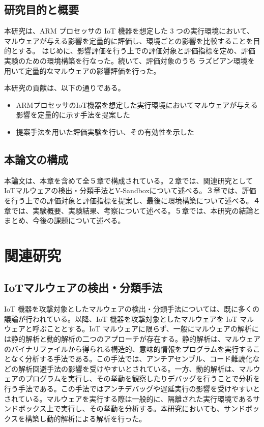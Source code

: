 \documentclass[12pt,a4paper,titlepage,report]{jsbook}
\begin{document}
\section{研究目的と概要}
本研究は、ARM プロセッサの IoT 機器を想定した 3 つの実行環境において、マルウェアが与える影響を定量的に評価し、環境ごとの影響を比較することを目的とする。
はじめに、影響評価を行う上での評価対象と評価指標を定め、評価実験のための環境構築を行なった。続いて、評価対象のうち ラズビアン環境を用いて定量的なマルウェアの影響評価を行った。


本研究の貢献は、以下の通りである。
\begin{itemize}
    \item ARMプロセッサのIoT機器を想定した実行環境においてマルウェアが与える影響を定量的に示す手法を提案した
    \item 提案手法を用いた評価実験を行い、その有効性を示した
\end{itemize}

\section{本論文の構成}
本論文は、本章を含めて全５章で構成されている。２章では、関連研究としてIoTマルウェアの検出・分類手法とV-Sandboxについて述べる。３章では、評価を行う上での評価対象と評価指標を提案し、最後に環境構築について述べる。４章では、実験概要、実験結果、考察について述べる。５章では、本研究の結論とまとめ、今後の課題について述べる。




\chapter{関連研究}
\section{IoTマルウェアの検出・分類手法}
IoT 機器を攻撃対象としたマルウェアの検出・分類手法については、既に多くの議論が行われている。以降、IoT 機器を攻撃対象としたマルウェアを IoT マルウェアと呼ぶこととする。IoT マルウェアに限らず、一般にマルウェアの解析には静的解析と動的解析の二つのアプローチが存在する。静的解析は、マルウェアのバイナリファイルから得られる構造的、意味的情報をプログラムを実行することなく分析する手法である。この手法では、アンチアセンブル、コード難読化などの解析回避手法の影響を受けやすいとされている。一方、動的解析は、マルウェアのプログラムを実行し、その挙動を観察したりデバッグを行うことで分析を行う手法である。この手法ではアンチデバッグや遅延実行の影響を受けやすいとされている。マルウェアを実行する際は一般的に、隔離された実行環境であるサンドボックス上で実行し、その挙動を分析する。本研究においても、サンドボックスを構築し動的解析による解析を行った。
\end{document}
